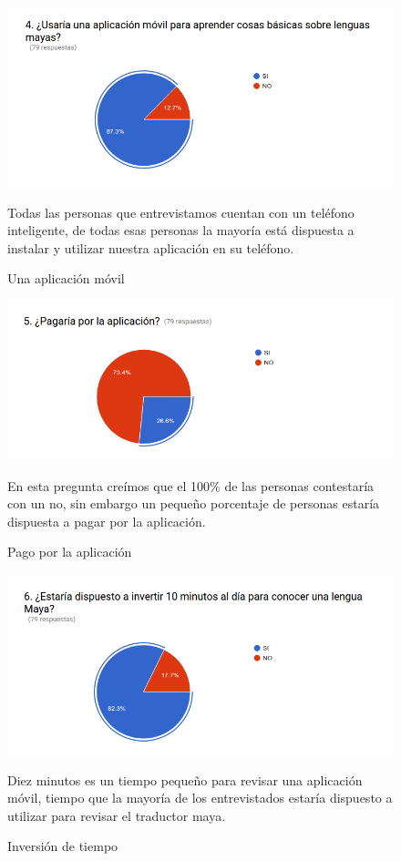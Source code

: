 \documentclass[a4paper,openright,11pt]{article}
\begin{document}
\begin{figure}
	\includegraphics[width=1.0\textwidth]{e4}
	\caption{Una aplicación móvil}
	\label{fig:e4}
	Todas las personas que entrevistamos cuentan con un teléfono inteligente, de todas esas personas la mayoría está dispuesta a instalar y utilizar nuestra aplicación en su teléfono.
\end{figure}
\begin{figure}
	\includegraphics[width=1.0\textwidth]{e5}
	\caption{Pago por la aplicación}
	\label{fig:e5}
	En esta pregunta creímos que el 100\% de las personas contestaría con un no, sin embargo un pequeño porcentaje de personas estaría dispuesta a pagar por la aplicación.
\end{figure}
\begin{figure}
	\includegraphics[width=1.0\textwidth]{e6}
	\caption{Inversión de tiempo}
	\label{fig:e6}
	Diez minutos es un tiempo pequeño para revisar una aplicación móvil, tiempo que la mayoría de los entrevistados estaría dispuesto a utilizar para revisar el traductor maya.
\end{figure}
\end{document}
